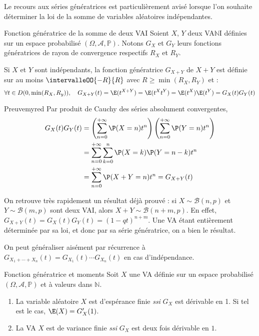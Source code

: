     Le recours aux séries génératrices est particulièrement avisé lorsque l’on souhaite déterminer la loi de la somme de variables aléatoires indépendantes. 

    \begin{theo}{Fonction génératrice de la somme de deux VAI}{}
        Soient $X$, $Y$ deux VA$\mathbb{N}$I définies sur un espace probabilisé $(\Omega, \mathcal{A}, \mathbb{P})$. Notons $G_X$ et $G_Y$ leurs fonctions génératrices de rayon de convergence respectifs $R_X$ et $R_Y$. 

        Si $X$ et $Y$ sont indépendants, la fonction génératrice $G_{X + Y}$ de $X + Y$ est définie sur au moins $\intervalleOO{-R}{R}$ avec $R \geq \min(R_X, R_Y)$ et :
        \[ \forall t \in D(0,\min(R_X,R_y)), \quad G_{X+Y}(t) = \E(t^{X + Y}) = \E(t^X t^Y) = \E(t^X)\E(t^Y) = G_X(t) G_Y(t) \]   
    \end{theo}

    \begin{demo}{Preuve}{myred}
        Par produit de Cauchy des séries absolument convergentes, 
        \begin{align}
            G_X(t)G_Y(t) 
            &= \left(\sum_{n=0}^{+\infty} \P(X=n) t^n\right)\left(\sum_{n=0}^{+\infty} \P(Y = n) t^n\right) \\
            &= \sum_{n=0}^{+\infty} \sum_{k=0}^{n} \P(X = k) \P(Y = n - k) t^n \\
            &= \sum_{n=0}^{+\infty} \P(X+Y = n)t^n = G_{X + Y}(t)
        \end{align}
    \end{demo}

    On retrouve très rapidement un résultat déjà prouvé : si $X \sim \mathcal{B}(n,p)$ et $Y \sim \mathcal{B}(m,p)$ sont deux VAI, alors $X + Y \sim \mathcal{B}(n+m,p)$. En effet, $G_{X+Y}(t) = G_X(t) G_Y(t) = (1 - qt)^{n + m}$. Une VA étant entièrement déterminée par sa loi, et donc par sa série génératrice, on a bien le résultat.

    On peut généraliser aisément par récurrence à $G_{X_1 + \cdots + X_n}(t) = G_{X_1}(t) \cdots G_{X_n}(t)$ en cas d’indépendance.

    \begin{theo}{Fonction génératrice et moments}{}
        Soit $X$ une VA définie sur un espace probabilisé $(\Omega, \mathcal{A}, \mathbb{P})$ et à valeurs dans $\mathbb{N}$. 
        \begin{enumerate}
            \item La variable aléatoire $X$ est d’espérance finie \textit{ssi} $G_X$ est dérivable en 1. Si tel est le cas, $\E(X) = G'_X(1)$. 
            \item La VA $X$ est de variance finie \textit{ssi} $G_X$ est deux fois dérivable en $1$.
        \end{enumerate}
    \end{theo}

